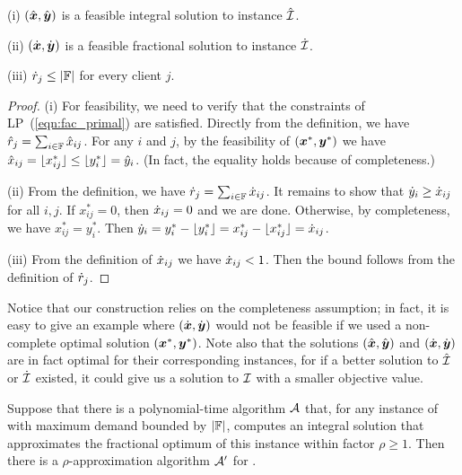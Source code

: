 \documentclass[11pt]{article}
\begin{document}

\begin{lemma}\label{lem: polynomial demands partition}
{\rm (i)}
  $(\hat{\boldsymbol{x}}, \hat{\boldsymbol{y}})$ is a feasible integral solution to
  instance ${\hat{\cal I}}$.

\noindent
{\rm (ii)}
  $(\dot{\boldsymbol{x}}, \dot{\boldsymbol{y}})$ is a feasible fractional
  solution to instance ${\dot{\cal I}}$.

\noindent
{\rm (iii)}
${\dot r}_j\leq |\mathbb{F}|$ for every client $j$.

\end{lemma}

\begin{proof}
(i) For feasibility, we need to verify that the constraints of LP~(\ref{eqn:fac_primal})
are satisfied. Directly from the definition, we have ${\hat r}_j = \sum_{i\in\mathbb{F}} {\hat x}_{ij}$.
For any $i$ and $j$, by the feasibility of $(\boldsymbol{x}^\ast,\boldsymbol{y}^\ast)$ we have
${\hat x}_{ij} = { \lfloor x_{ij}^\ast \rfloor } \le { \lfloor y^\ast_i \rfloor } = {\hat y}_i$. (In fact, the equality
holds because of completeness.)

(ii) From the definition, we have  ${\dot r}_j = \sum_{i\in\mathbb{F}} {\dot x}_{ij}$.
It remains to show that ${\dot y}_i \geq {\dot x}_{ij}$ for all $i,j$. 
If $x_{ij}^\ast=0$, then ${\dot x}_{ij}=0$ and we are done. 
Otherwise, by completeness, we have $x_{ij}^\ast=y_i^\ast$. 
Then  ${\dot y}_i = y_i^\ast - { \lfloor y_i^\ast \rfloor } = x_{ij}^\ast - { \lfloor x_{ij}^\ast \rfloor } ={\dot x}_{ij}$. 

(iii) From the definition of ${\dot x}_{ij}$ we have
  ${\dot x}_{ij} < 1$.  Then the bound follows from the definition of ${\dot r}_j$.
\end{proof}

Notice that our construction relies on the completeness assumption; in fact, it is
easy to give an example where $(\dot{\boldsymbol{x}}, \dot{\boldsymbol{y}})$ would not be feasible if we
used a non-complete optimal solution $(\boldsymbol{x}^\ast,\boldsymbol{y}^\ast)$.
Note also that the solutions $(\hat{\boldsymbol{x}},\hat{\boldsymbol{y}})$ and $(\dot{\boldsymbol{x}}, \dot{\boldsymbol{y}})$ are in fact
optimal for their corresponding instances, for if a better solution to ${\hat{\cal I}}$ or
${\dot{\cal I}}$ existed, it could
give us a solution to $\mathcal{I}$ with a smaller objective value.


\begin{theorem}\label{thm: reduction to polynomial}
  Suppose that there is a polynomial-time algorithm ${\cal A}$
  that, for any instance of {\FTFP} with maximum demand
  bounded by $|\mathbb{F}|$, computes an integral solution
  that approximates the fractional optimum of this instance
  within factor $\rho\geq 1$.  Then there is a
  $\rho$-approximation algorithm ${\cal A}'$ for {\FTFP}.
\end{theorem}
\end{document}

